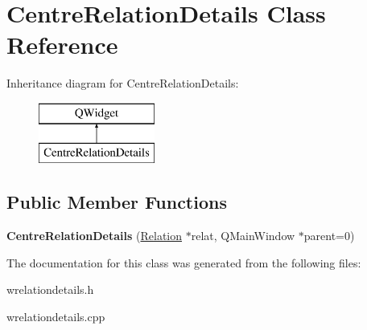 \hypertarget{class_centre_relation_details}{}\section{Centre\+Relation\+Details Class Reference}
\label{class_centre_relation_details}
Inheritance diagram for Centre\+Relation\+Details\+:\begin{figure}[H]
\begin{center}
\leavevmode
\includegraphics[height=2.000000cm]{class_centre_relation_details}
\end{center}
\end{figure}
\subsection*{Public Member Functions}
\begin{DoxyCompactItemize}
\item 
\mbox{\label{class_centre_relation_details_ac6defcbb98de2c88728da1c260bf0b6f}} 
{\bfseries Centre\+Relation\+Details} (\hyperlink{class_relation}{Relation} $\ast$relat, Q\+Main\+Window $\ast$parent=0)
\end{DoxyCompactItemize}


The documentation for this class was generated from the following files\+:\begin{DoxyCompactItemize}
\item 
wrelationdetails.\+h\item 
wrelationdetails.\+cpp\end{DoxyCompactItemize}
